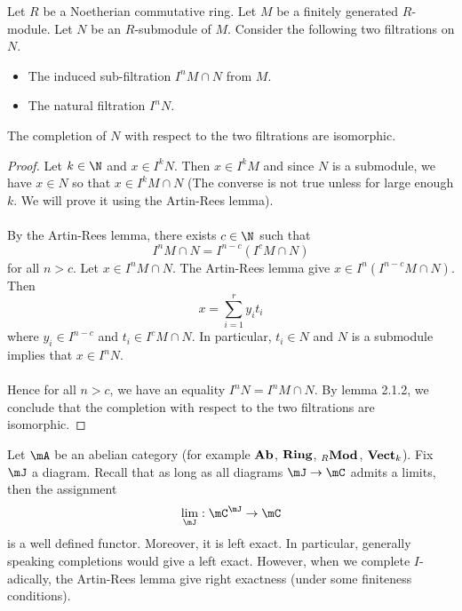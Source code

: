 \documentclass[a4paper]{article}
\begin{document}
\begin{prp}{}{}Let $R$ be a Noetherian commutative ring. Let $M$ be a finitely generated $R$-module. Let $N$ be an $R$-submodule of $M$. Consider the following two filtrations on $N$. 
\begin{itemize}
\item The induced sub-filtration $I^nM\cap N$ from $M$. 
\item The natural filtration $I^nN$. 
\end{itemize}
The completion of $N$ with respect to the two filtrations are isomorphic. 
\begin{proof}
Let $k\in\N$ and $x\in I^kN$. Then $x\in I^kM$ and since $N$ is a submodule, we have $x\in N$ so that $x\in I^kM\cap N$ (The converse is not true unless for large enough $k$. We will prove it using the Artin-Rees lemma). \\~\\

By the Artin-Rees lemma, there exists $c\in\N$ such that $$I^nM\cap N=I^{n-c}(I^cM\cap N)$$ for all $n>c$. Let $x\in I^nM\cap N$. The Artin-Rees lemma give $x\in I^n(I^{n-c}M\cap N)$. Then $$x=\sum_{i=1}^ry_it_i$$ where $y_i\in I^{n-c}$ and $t_i\in I^cM\cap N$. In particular, $t_i\in N$ and $N$ is a submodule implies that $x\in I^nN$. \\~\\

Hence for all $n>c$, we have an equality $I^nN=I^nM\cap N$. By lemma 2.1.2, we conclude that the completion with respect to the two filtrations are isomorphic. 
\end{proof}
\end{prp}

Let $\mA$ be an abelian category (for example $\bold{Ab}$, $\bold{Ring}$, ${_R\bold{Mod}}$, $\bold{Vect}_k$). Fix $\mJ$ a diagram. Recall that as long as all diagrams $\mJ\to\mC$ admits a limits, then the assignment $$\lim_\mJ:\mC^\mJ\to\mC$$ is a well defined functor. Moreover, it is left exact. In particular, generally speaking completions would give a left exact. However, when we complete $I$-adically, the Artin-Rees lemma give right exactness (under some finiteness conditions). 
\end{document}
